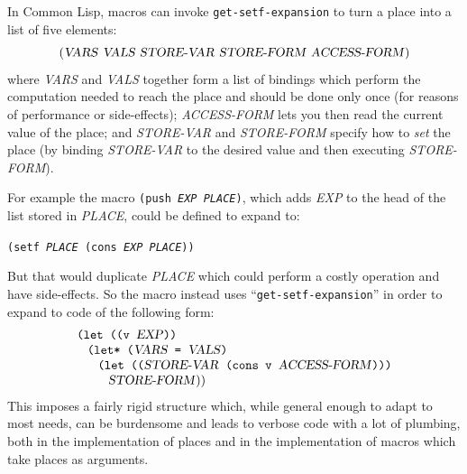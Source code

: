 \documentclass[format=acmsmall, review]{acmart}
\makeatletter
\newcommand \MAlign [1] {\begin{array}{@{}l@{}}#1\end{array}}
\newcommand \id[1] {\textrm{\textsl{#1}}}
\makeatother
\begin{document}
In Common Lisp, macros can invoke \texttt{get-setf-expansion}
to turn a place into a list of five elements:
\begin{displaymath}
  (\id{VARS}~\id{VALS}~\id{STORE-VAR}~\id{STORE-FORM}
  ~\id{ACCESS-FORM})
\end{displaymath}
where \id{VARS} and \id{VALS} together form a list of bindings which perform
the computation needed to reach the place and should be done only once
(for reasons of performance or side-effects); \id{ACCESS-FORM} lets you then
read the current value of the place; and \id{STORE-VAR} and \id{STORE-FORM}
specify how to \emph{set} the place (by binding \id{STORE-VAR} to the
desired value and then executing \id{STORE-FORM}).

For example the macro \texttt{(push \id{EXP} \id{PLACE})}, which adds
\id{EXP} to the head of the list stored in \id{PLACE}, could be defined to
expand to:
%
\begin{center}
\texttt{(setf \id{PLACE} (cons \id{EXP} \id{PLACE}))}
\end{center}
%
But that would duplicate \id{PLACE} which could perform a costly operation
and have side-effects.  So the macro instead uses
``\texttt{get-setf-expansion}'' in order to expand to code of the following
form:
\begin{displaymath}
  \MAlign{
    \texttt{(let ((v \id{EXP}))} \\
    \;\;\;\MAlign{
      \texttt{(let* (\id{VARS} = \id{VALS})} \\
      \;\;\;\MAlign{
        \texttt{(let ((\id{STORE-VAR} (cons v \id{ACCESS-FORM})))} \\
        \;\;\;\id{STORE-FORM}))}}}
\end{displaymath}
This imposes a fairly rigid structure which, while general enough to adapt
to most needs, can be burdensome and leads to verbose code with a lot
of plumbing, both in the implementation of places and in the implementation
of macros which take places as arguments.
\end{document}
